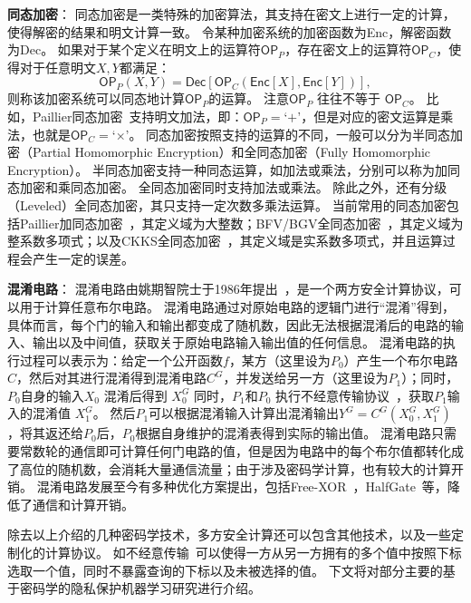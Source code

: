 \textbf{同态加密}：
同态加密是一类特殊的加密算法，其支持在密文上进行一定的计算，使得解密的结果和明文计算一致。
%
令某种加密系统的加密函数为\textsf{Enc}，解密函数为\textsf{Dec}。
%
如果对于某个定义在明文上的运算符$\mathsf{OP}_P$，存在密文上的运算符$\mathsf{OP}_C$，使得对于任意明文$X, Y$都满足：
\begin{equation}
    \textsf{OP}_P(X, Y) = \mathsf{Dec}[\mathsf{OP}_C (\mathsf{Enc}[X], \mathsf{Enc}[Y])],
\end{equation}
%
则称该加密系统可以同态地计算$\mathsf{OP}_P$的运算。
%
注意$\mathsf{OP}_P$ 往往不等于 $\mathsf{OP}_C$。
比如，Paillier同态加密~\cite{paillier1999}支持明文加法，即：$\mathsf{OP}_P=$`$+$'，但是对应的密文运算是乘法，也就是$\mathsf{OP}_C=$`$\times$'。
%
同态加密按照支持的运算的不同，一般可以分为半同态加密（Partial Homomorphic Encryption）和全同态加密（Fully Homomorphic Encryption）。
%
半同态加密支持一种同态运算，如加法或乘法，分别可以称为加同态加密和乘同态加密。
%
全同态加密同时支持加法或乘法。
%
除此之外，还有分级（Leveled）全同态加密，其只支持一定次数多乘法运算。
%
当前常用的同态加密包括Paillier加同态加密~\cite{paillier1999}，其定义域为大整数；BFV/BGV全同态加密~\cite{2012bfv1,2012bfv2,2014bgv}，其定义域为整系数多项式；以及CKKS全同态加密~\cite{ckks2017}，其定义域是实系数多项式，并且运算过程会产生一定的误差。


\textbf{混淆电路}：
混淆电路由姚期智院士于1986年提出~\cite{yao1986gc}，是一个两方安全计算协议，可以用于计算任意布尔电路。
%
混淆电路通过对原始电路的逻辑门进行“混淆”得到，具体而言，每个门的输入和输出都变成了随机数，因此无法根据混淆后的电路的输入、输出以及中间值，获取关于原始电路输入输出值的任何信息。
%
混淆电路的执行过程可以表示为：给定一个公开函数$f$，某方（这里设为$P_0$）产生一个布尔电路$C$，然后对其进行混淆得到混淆电路$C^G$，并发送给另一方（这里设为$P_1$）；同时，$P_0$自身的输入$X_0$ 混淆后得到 $X_0^G$
%
同时，$P_1$和$P_0$ 执行不经意传输协议~\cite{yadav_2022_ot_survey}，获取$P_1$输入的混淆值 $X_1^G$。
%
然后$P_1$可以根据混淆输入计算出混淆输出$Y^G = C^G(X_0^G, X_1^G)$，将其返还给$P_0$后，$P_0$根据自身维护的混淆表得到实际的输出值。
%
混淆电路只需要常数轮的通信即可计算任何门电路的值，但是因为电路中的每个布尔值都转化成了高位的随机数，会消耗大量通信流量；由于涉及密码学计算，也有较大的计算开销。
%
混淆电路发展至今有多种优化方案提出，包括Free-XOR~\cite{kolesnikov2008free_xor}，HalfGate~\cite{zahur2015halfgate}等，降低了通信和计算开销。
%

除去以上介绍的几种密码学技术，多方安全计算还可以包含其他技术，以及一些定制化的计算协议。
如不经意传输~\cite{yadav_2022_ot_survey,chou_2015_simplest_ot}可以使得一方从另一方拥有的多个值中按照下标选取一个值，同时不暴露查询的下标以及未被选择的值。
%
下文将对部分主要的基于密码学的隐私保护机器学习研究进行介绍。


